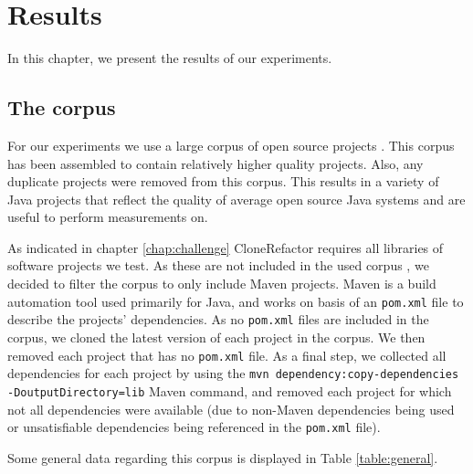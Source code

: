 \chapter{Results}\label{ch:results}
In this chapter, we present the results of our experiments.

\section{The corpus}\label{chap:corpus}
For our experiments we use a large corpus of open source projects \cite{githubCorpus2013}. This corpus has been assembled to contain relatively higher quality projects. Also, any duplicate projects were removed from this corpus. This results in a variety of Java projects that reflect the quality of average open source Java systems and are useful to perform measurements on.

As indicated in chapter \ref{chap:challenge} CloneRefactor requires all libraries of software projects we test. As these are not included in the used corpus \cite{githubCorpus2013}, we decided to filter the corpus to only include Maven projects. Maven is a build automation tool used primarily for Java, and works on basis of an \texttt{pom.xml} file to describe the projects' dependencies. As no \texttt{pom.xml} files are included in the corpus, we cloned the latest version of each project in the corpus. We then removed each project that has no \texttt{pom.xml} file. As a final step, we collected all dependencies for each project by using the \texttt{mvn dependency:copy-dependencies -DoutputDirectory=lib} Maven command, and removed each project for which not all dependencies were available (due to non-Maven dependencies being used or unsatisfiable dependencies being referenced in the \texttt{pom.xml} file).

Some general data regarding this corpus is displayed in Table \ref{table:general}.

